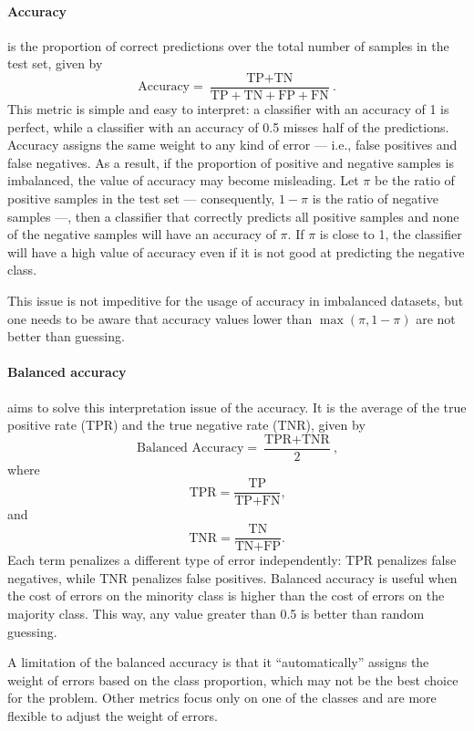 \paragraph{Accuracy} is the proportion of correct predictions over the total number of
samples in the test set, given by
\begin{equation*}
  \text{Accuracy} = \frac{\text{TP} + \text{TN}}{\text{TP} + \text{TN} + \text{FP} + \text{FN}}\text{.}
\end{equation*}
This metric is simple and easy to interpret: a classifier with an accuracy of 1 is
perfect, while a classifier with an accuracy of 0.5 misses half of the predictions.
Accuracy assigns the same weight to any kind of error --- i.e., false positives and false
negatives.  As a result, if the proportion of positive and negative samples is imbalanced,
the value of accuracy may become misleading.  Let $\pi$ be the ratio of positive samples in
the test set --- consequently, $1-\pi$ is the ratio of negative samples ---, then a
classifier that correctly predicts all positive samples and none of the negative samples
will have an accuracy of $\pi$.  If $\pi$ is close to 1, the classifier will have a high value
of accuracy even if it is not good at predicting the negative class.

This issue is not impeditive for the usage of accuracy in imbalanced datasets, but one
needs to be aware that accuracy values lower than $\max(\pi, 1-\pi)$ are not better than
guessing.

\paragraph{Balanced accuracy} aims to solve this interpretation issue of the accuracy.  It
is the average of the true positive rate (TPR) and the true negative rate (TNR), given by
\begin{equation*}
  \text{Balanced Accuracy} = \frac{\text{TPR} + \text{TNR}}{2}\text{,}
\end{equation*}
where
\[
  \text{TPR} = \frac{\text{TP}}{\text{TP} + \text{FN}}\text{,}
\]
and
\[
  \text{TNR} = \frac{\text{TN}}{\text{TN} + \text{FP}}\text{.}
\]
Each term penalizes a different type of error independently: TPR penalizes false
negatives, while TNR penalizes false positives.  Balanced accuracy is useful when the cost
of errors on the minority class is higher than the cost of errors on the majority class.
This way, any value greater than 0.5 is better than random guessing.

A limitation of the balanced accuracy is that it ``automatically'' assigns the weight of
errors based on the class proportion, which may not be the best choice for the problem.
Other metrics focus only on one of the classes and are more flexible to adjust the weight of
errors.

